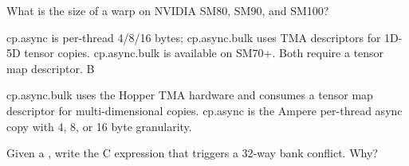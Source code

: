 \documentclass{problemset}
\begin{document}
\maketitle

What is the size of a warp on NVIDIA SM80, SM90, and SM100?

{cp.async is per-thread 4/8/16 bytes; cp.async.bulk uses TMA descriptors for 1D-5D tensor copies.}
{cp.async.bulk is available on SM70+.}
{Both require a tensor map descriptor.}
{B}

\begin{solutionbox}
	cp.async.bulk uses the Hopper TMA hardware and consumes a tensor map descriptor for
	multi-dimensional copies. cp.async is the Ampere per-thread async copy with 4, 8, or 16
	byte granularity.
\end{solutionbox}

Given a , write the C expression that triggers a 32-way
bank conflict. Why?
\end{document}
